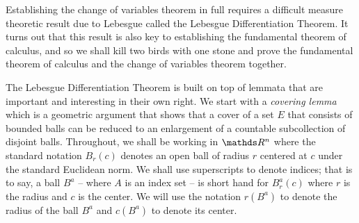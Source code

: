 Establishing the change of variables theorem in full requires a difficult
measure theoretic result due to Lebesgue called the Lebesgue Differentiation
Theorem. It turns out that this result is also key to establishing
the fundamental theorem of calculus, and so we shall kill two birds with one stone and prove the 
fundamental theorem of calculus and the change of variables theorem together.

The Lebesgue Differentiation Theorem is built on top of lemmata that are important and interesting in their own right. We start with a \emph{covering lemma} 
which is a geometric argument that shows that a cover of a set $E$ that consists of bounded balls can be reduced to an enlargement of a countable subcollection of disjoint balls. Throughout, we shall be working in $\R^n$ where the standard notation $B_r\left(c\right)$ denotes an open ball of radius $r$ 
centered at $c$ under the standard Euclidean norm. We shall use superscripts to denote indices; that is to say, a ball $B^a$ -- where $A$ is an index set -- is short hand for
$B^a_r(c)$ where $r$ is the radius and $c$ is the center. We will use the notation $r(B^a)$ to denote the radius of the ball $B^a$ and $c(B^a)$ to denote its center. 

